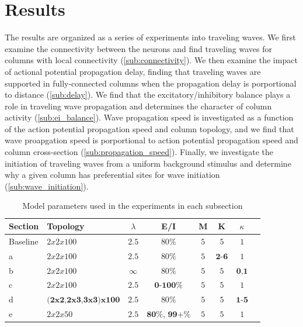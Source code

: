 \documentclass[a4paper,11pt]{article}
\begin{document}
\section{Results}
The results are organized as a series of experiments into traveling waves.
We first examine the connectivity between the neurons and find traveling waves for columns with local connectivity (\ref{sub:connectivity}).
We then examine the impact of actional potential propagation delay, finding that traveling waves are supported in fully-connected columns when the propagation delay is porportional to distance (\ref{sub:delay}).
We find that the excitatory/inhibitory balance plays a role in traveling wave propagation and determines the character of column activity (\ref{sub:ei_balance}).
Wave propagation speed is investigated as a function of the action potential propagation speed and column topology, and we find that wave proapgation speed is porportional to action potential propagation speed and column cross-section (\ref{sub:propagation_speed}).
Finally, we investigate the initiation of traveling waves from a uniform background stimulus and determine why a given column has preferential sites for wave initiation (\ref{sub:wave_initiation}).

\begin{table}[!htb]
 \caption{Model parameters used in the experiments in each subsection}
 \label{tab:experiment_params}
 \centering
 \begin{tabularx}{\textwidth}{l | X | c | c | c | c | c | r}
  \textbf{Section} & \textbf{Topology} & \textbf{$\lambda$} & \textbf{E/I} & \textbf{M} & \textbf{K} & \textbf{$\kappa$} \\
  \hline
  Baseline & $2x2x100$ & $2.5$ & $80\%$ & $5$ & $5$ & $1$ \\ 
  a & $2x2x100$ & $2.5$ & $80\%$ & $5$ & $\textbf{2-6}$ & $1$ \\ 
  b & $2x2x100$ & $\infty$ & $80\%$ & $5$ & $5$ & $\textbf{0,1}$ \\ 
  c & $2x2x100$ & $2.5$ & $\textbf{0-100}\%$ & $5$ & $5$ & $1$ \\ 
  d & $\textbf{(2x2,2x3,3x3)x100}$ & $2.5$ & $80\%$ & $5$ & $5$ & $\textbf{1-5}$ \\ 
  e & $2x2x50$ & $2.5$ & $\textbf{80\% , 99+\%}$ & $5$ & $5$ & $1$ \\ 
 \end{tabularx}
\end{table}
\end{document}
